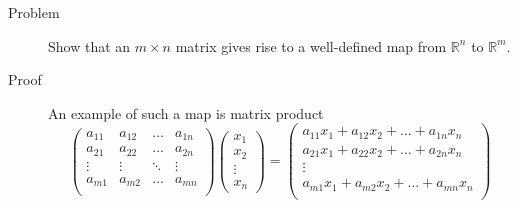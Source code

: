 \begin{description}
\item[Problem] Show that an $m \times n$ matrix gives rise to a well-defined
map from $\mathbb{R}^n$ to $\mathbb{R}^m$.
\item[Proof] An example of such a map is matrix product
\begin{equation*}
\begin{pmatrix}
a_{11} & a_{12} & \ldots & a_{1n} \\
a_{21} & a_{22} & \ldots & a_{2n} \\
\vdots & \vdots & \ddots & \vdots \\
a_{m1} & a_{m2} & \ldots & a_{mn} \\
\end{pmatrix}
\begin{pmatrix}
x_1 \\
x_2 \\
\vdots \\
x_n
\end{pmatrix}
=
\begin{pmatrix}
a_{11} x_1 + a_{12} x_2 + \ldots + a_{1n} x_n \\
a_{21} x_1 + a_{22} x_2 + \ldots + a_{2n} x_n \\
\vdots \\
a_{m1} x_1 + a_{m2} x_2 + \ldots + a_{mn} x_n \\
\end{pmatrix}
\end{equation*}
\end{description}
